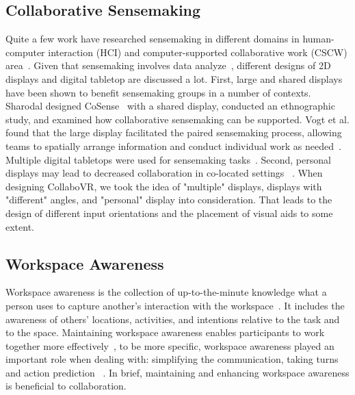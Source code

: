 \documentclass{sigchi}
\begin{document}
\subsection{Collaborative Sensemaking}
Quite a few work have researched sensemaking in different domains in human-computer interaction (HCI) and computer-supported collaborative work (CSCW) area~\cite{albolino2007sensemaking, billman2007medical, landgren2007study,paul2009understanding}. Given that sensemaking involves data analyze~\cite{yi2008understanding}, different designs of 2D displays and digital tabletop are discussed a lot. First, large and shared displays have been shown to benefit sensemaking groups in a number of contexts. Sharodal designed CoSense~\cite{dervin1992mind} with a shared display, conducted an ethnographic study, and examined how collaborative sensemaking can be supported. Vogt et al. found that the large display facilitated the paired sensemaking process, allowing teams to spatially arrange information and conduct individual work as needed~\cite{vogt2011co}. Multiple digital tabletops were used for sensemaking tasks~\cite{isenberg2010exploratory,morris2010wesearch}. Second, personal displays may lead to decreased collaboration in co-located settings ~\cite{chung2013investigating, wallace2009investigating}.
When designing CollaboVR, we took the idea of "multiple" displays, displays with "different" angles, and "personal" display into consideration. That leads to the design of different input orientations and the placement of visual aids to some extent.

\subsection{Workspace Awareness}
Workspace awareness is the collection of up-to-the-minute knowledge what a person uses to capture another's interaction with the workspace~\cite{gutwin1996workspace}. It includes the awareness of others' locations, activities, and intentions relative to the task and to the space. Maintaining workspace awareness enables participants to work together more effectively~\cite{gutwin1998design, gutwin2002descriptive}, to be more specific, workspace awareness played an important role when dealing with: simplifying the communication, taking turns and action prediction ~\cite{gutwin2002descriptive}. In brief, maintaining and enhancing workspace awareness is beneficial to collaboration. 
\end{document}

